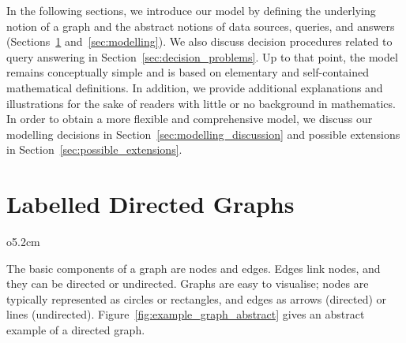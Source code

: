 In the following sections, we introduce our model
by defining the underlying notion of a graph and the abstract notions of data sources, queries, and answers
(Sections~\ref{sec:labelled_digraphs} and~\ref{sec:modelling}).
We also discuss decision procedures related to query answering in Section~\ref{sec:decision_problems}.
Up to that point, the model remains conceptually simple
and is based on elementary and self-contained mathematical definitions.
In addition, we provide additional explanations and illustrations
for the sake of readers with little or no background in mathematics.
In order to obtain a more flexible and comprehensive model, we discuss our modelling decisions
in Section~\ref{sec:modelling_discussion} and possible extensions in Section~\ref{sec:possible_extensions}.

\section{Labelled Directed Graphs}
\label{sec:labelled_digraphs}

\begin{wrapfigure}[6]{o}{5.2cm}
  \centering
  \vspace*{-.7\baselineskip}
  \caption{A directed graph}
  \label{fig:example_graph_abstract}
\end{wrapfigure}

The basic components of a graph are nodes and edges. Edges link nodes, and they can be directed
or undirected. Graphs are easy to visualise; nodes are typically represented as circles
or rectangles, and edges as arrows (directed) or lines (undirected).
Figure~\ref{fig:example_graph_abstract} gives an abstract example of a directed graph.

